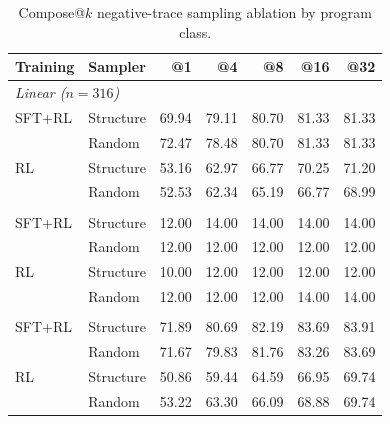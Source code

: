 \documentclass[10pt]{article}
\begin{document}
\begin{table}[htbp]
\centering

\begin{tabular}{llrrrrr}
\toprule
\rowcolor{headerbg}
Training & Sampler & @1 & @4 & @8 & @16 & @32 \\
\midrule
\multicolumn{7}{l}{\textit{Linear ($n=316$)}} \\
SFT+RL & Structure & 69.94 & 79.11 & 80.70 & 81.33 & 81.33 \\
       & Random    & 72.47 & 78.48 & 80.70 & 81.33 & 81.33 \\
RL     & Structure & 53.16 & 62.97 & 66.77 & 70.25 & 71.20 \\
       & Random    & 52.53 & 62.34 & 65.19 & 66.77 & 68.99 \\
\addlinespace
\multicolumn{7}{l}{\textit{NLA ($n=50$)}} \\
SFT+RL & Structure & 12.00 & 14.00 & 14.00 & 14.00 & 14.00 \\
       & Random    & 12.00 & 12.00 & 12.00 & 12.00 & 12.00 \\
RL     & Structure & 10.00 & 12.00 & 12.00 & 12.00 & 12.00 \\
       & Random    & 12.00 & 12.00 & 12.00 & 14.00 & 14.00 \\
\addlinespace
\multicolumn{7}{l}{\textit{Loopy ($n=466$)}} \\
SFT+RL & Structure & 71.89 & 80.69 & 82.19 & 83.69 & 83.91 \\
       & Random    & 71.67 & 79.83 & 81.76 & 83.26 & 83.69 \\
RL     & Structure & 50.86 & 59.44 & 64.59 & 66.95 & 69.74 \\
       & Random    & 53.22 & 63.30 & 66.09 & 68.88 & 69.74 \\
\bottomrule
\end{tabular}
\caption{Compose@\(k\) negative-trace sampling ablation by program class.}
\label{tab:sampler-compose-strata}
\end{table}
\end{document}
